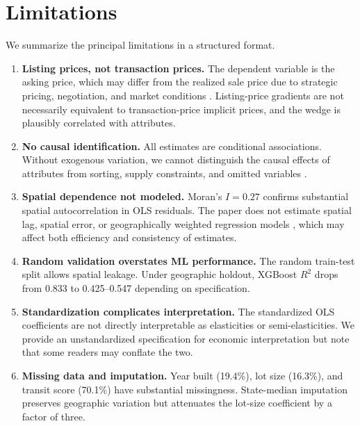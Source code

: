 %
\section{Limitations}
\label{sec:limitations}

We summarize the principal limitations in a structured format.

\begin{enumerate}[nosep]
    \item \textbf{Listing prices, not transaction prices.} The dependent variable is the asking price, which may differ from the realized sale price due to strategic pricing, negotiation, and market conditions \citep{horowitz1992role, genesove2001loss, han2016role}. Listing-price gradients are not necessarily equivalent to transaction-price implicit prices, and the wedge is plausibly correlated with attributes.

    \item \textbf{No causal identification.} All estimates are conditional associations. Without exogenous variation, we cannot distinguish the causal effects of attributes from sorting, supply constraints, and omitted variables \citep{ekeland2004identification, roberts2013endogeneity}.

    \item \textbf{Spatial dependence not modeled.} Moran's $I = 0.27$ confirms substantial spatial autocorrelation in OLS residuals. The paper does not estimate spatial lag, spatial error, or geographically weighted regression models \citep{anselin1988spatial, lesage2009introduction}, which may affect both efficiency and consistency of estimates.

    \item \textbf{Random validation overstates ML performance.} The random train-test split allows spatial leakage. Under geographic holdout, XGBoost $R^2$ drops from 0.833 to 0.425--0.547 depending on specification.

    \item \textbf{Standardization complicates interpretation.} The standardized OLS coefficients are not directly interpretable as elasticities or semi-elasticities. We provide an unstandardized specification for economic interpretation but note that some readers may conflate the two.

    \item \textbf{Missing data and imputation.} Year built (19.4\%), lot size (16.3\%), and transit score (70.1\%) have substantial missingness. State-median imputation preserves geographic variation but attenuates the lot-size coefficient by a factor of three.


\end{enumerate}
